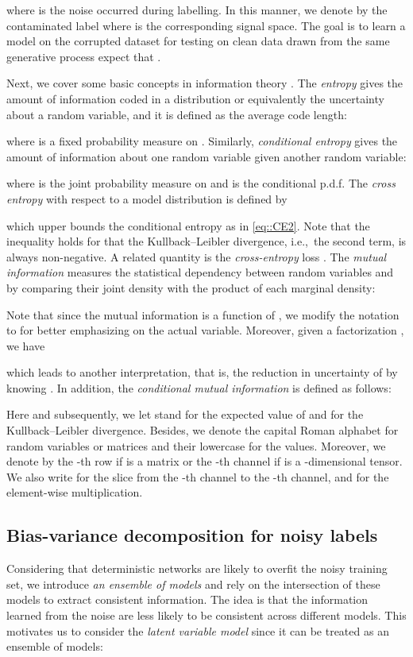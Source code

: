 \documentclass[journal]{IEEEtran}
\begin{document}
where  is the noise occurred during labelling. 
In this manner, we denote by  the contaminated label where  is the corresponding signal space.
The goal is to learn a model on the corrupted dataset 
for testing on clean data drawn from the same generative process expect that .

Next, we cover some basic concepts in information theory \cite{shannon1948mathematical}.
The \textit{entropy} gives the amount of information coded in a distribution or equivalently the uncertainty about a random variable, and it is defined as the average code length:

where  is a fixed probability measure on .
Similarly, \textit{conditional entropy} gives the amount of information about one random variable given another random variable:

where  is the joint probability measure on  and  is the conditional p.d.f.
The \textit{cross entropy} with respect to a model distribution  is defined by

which upper bounds the conditional entropy as in \eqref{eq::CE2}. 
Note that the inequality holds for that the Kullback–Leibler divergence, i.e.,~the second term, is always non-negative.
A related quantity is the \textit{cross-entropy} loss .
The \textit{mutual information} measures the statistical dependency between random variables  and  by comparing their joint density with the product of each marginal density:

Note that since the mutual information is a function of , we modify the notation to  for better emphasizing on the actual variable.
Moreover, given a factorization , we have

which leads to another interpretation, that is, the reduction in uncertainty of  by knowing .
In addition, the \textit{conditional mutual information} is defined as follows:


Here and subsequently, we let  stand for the expected value of  and  for the Kullback–Leibler divergence.
Besides, we denote the capital Roman alphabet for random variables or matrices and their lowercase for the values.
Moreover, we denote by  the -th row if  is a matrix or the -th channel if  is a -dimensional tensor. 
We also write  for the slice from the -th channel to the -th channel, and  for the element-wise multiplication.



\subsection{Bias-variance decomposition for noisy labels} \label{subsec::overMemo}
Considering that deterministic networks are likely to overfit the noisy training set, we introduce \textit{an ensemble of models} and rely on the intersection of these models to extract consistent information.
The idea is that the information learned from the noise are less likely to be consistent across different models.
This motivates us to consider the \textit{latent variable model} since it can be treated as an ensemble of models:
\end{document}
